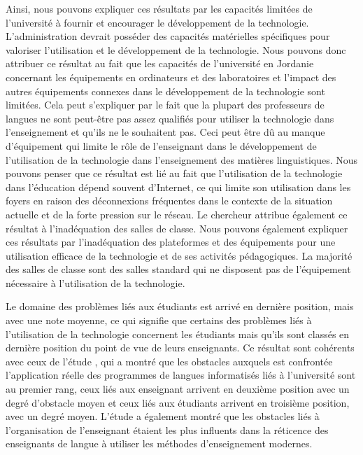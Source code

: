 \documentclass[french]{textolivre}
\begin{document}
Ainsi, nous pouvons expliquer ces résultats par les capacités limitées de l'université à fournir et encourager le développement de la technologie. L'administration devrait posséder des capacités matérielles spécifiques pour valoriser l'utilisation et le développement de la technologie. Nous pouvons donc attribuer ce résultat au fait que les capacités de l'université en Jordanie concernant les équipements en ordinateurs et des laboratoires et l'impact des autres équipements connexes dans le développement de la technologie sont limitées. Cela peut s'expliquer par le fait que la plupart des professeurs de langues ne sont peut-être pas assez qualifiés pour utiliser la technologie dans l'enseignement et qu'ils ne le souhaitent pas. Ceci peut être dû au manque d'équipement qui limite le rôle de l'enseignant dans le développement de l'utilisation de la technologie dans l'enseignement des matières linguistiques. Nous pouvons penser que ce résultat est lié au fait que l’utilisation de la technologie dans l'éducation dépend souvent d'Internet, ce qui limite son utilisation dans les foyers en raison des déconnexions fréquentes dans le contexte de la situation actuelle et de la forte pression sur le réseau. Le chercheur attribue également ce résultat à l'inadéquation des salles de classe. Nous pouvons également expliquer ces résultats par l'inadéquation des plateformes et des équipements pour une utilisation efficace de la technologie et de ses activités pédagogiques. La majorité des salles de classe sont des salles standard qui ne disposent pas de l'équipement nécessaire à l'utilisation de la technologie.

Le domaine des problèmes liés aux étudiants est arrivé en dernière position, mais avec une note moyenne, ce qui signifie que certains des problèmes liés à l'utilisation de la technologie concernent les étudiants mais qu'ils sont classés en dernière position du point de vue de leurs enseignants. Ce résultat sont cohérents avec ceux de l'étude \textcite{alomari2011}, qui a montré que les obstacles auxquels est confrontée l'application réelle des programmes de langues informatisés liés à l'université sont au premier rang, ceux liés aux enseignant arrivent en deuxième position avec un degré d'obstacle moyen et ceux liés aux étudiants arrivent en troisième position, avec un degré moyen. L'étude \textcite{alnuaimi2011} a également montré que les obstacles liés à l'organisation de l'enseignant étaient les plus influents dans la réticence des enseignants de langue à utiliser les méthodes d'enseignement modernes.
\end{document}
